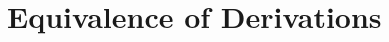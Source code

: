 \documentclass[sn-mathphys-num]{sn-jnl}%
\newcommand{\GG}{\Gamma}
\newcommand{\vd}{\vdash}
\newcommand{\mf}[1]{\mathsf{#1}}
\theoremstyle{thmstyleone}%
\theoremstyle{thmstyletwo}%
\theoremstyle{thmstylethree}%
\newtheorem{definition}[theorem]{Definition}%
\begin{document}


\section{Equivalence of Derivations}\label{sec:equiv}
\end{document}
